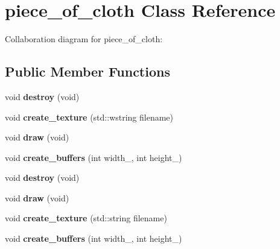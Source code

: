 \hypertarget{classpiece__of__cloth}{\section{piece\+\_\+of\+\_\+cloth Class Reference}
\label{classpiece__of__cloth}
}


Collaboration diagram for piece\+\_\+of\+\_\+cloth\+:
\subsection*{Public Member Functions}
\begin{DoxyCompactItemize}
\item 
\hypertarget{classpiece__of__cloth_a93e6875aec1c6411a0ab2e14461c4fdc}{void {\bfseries destroy} (void)}\label{classpiece__of__cloth_a93e6875aec1c6411a0ab2e14461c4fdc}

\item 
\hypertarget{classpiece__of__cloth_a80281dde5ea809fef711a4b1c7defcbf}{void {\bfseries create\+\_\+texture} (std\+::wstring filename)}\label{classpiece__of__cloth_a80281dde5ea809fef711a4b1c7defcbf}

\item 
\hypertarget{classpiece__of__cloth_aa65dbb30c483cc26e81cd8b5e55c3301}{void {\bfseries draw} (void)}\label{classpiece__of__cloth_aa65dbb30c483cc26e81cd8b5e55c3301}

\item 
\hypertarget{classpiece__of__cloth_a02c034aedca24da6d8841ee73917a280}{void {\bfseries create\+\_\+buffers} (int width\+\_\+, int height\+\_\+)}\label{classpiece__of__cloth_a02c034aedca24da6d8841ee73917a280}

\item 
\hypertarget{classpiece__of__cloth_a93e6875aec1c6411a0ab2e14461c4fdc}{void {\bfseries destroy} (void)}\label{classpiece__of__cloth_a93e6875aec1c6411a0ab2e14461c4fdc}

\item 
\hypertarget{classpiece__of__cloth_aa65dbb30c483cc26e81cd8b5e55c3301}{void {\bfseries draw} (void)}\label{classpiece__of__cloth_aa65dbb30c483cc26e81cd8b5e55c3301}

\item 
\hypertarget{classpiece__of__cloth_a689dfceca3c40a299c91dbda79e9eaf6}{void {\bfseries create\+\_\+texture} (std\+::string filename)}\label{classpiece__of__cloth_a689dfceca3c40a299c91dbda79e9eaf6}

\item 
\hypertarget{classpiece__of__cloth_a02c034aedca24da6d8841ee73917a280}{void {\bfseries create\+\_\+buffers} (int width\+\_\+, int height\+\_\+)}\label{classpiece__of__cloth_a02c034aedca24da6d8841ee73917a280}

\end{DoxyCompactItemize}
